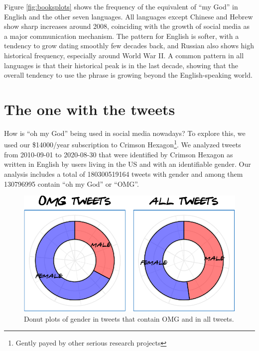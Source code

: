 \documentclass[]{article}
\begin{document}
Figure \ref{fig:booksplots} shows the frequency of the equivalent of ``my God'' in English and the other seven languages. All languages except Chinese and Hebrew show sharp increases around 2008, coinciding with the growth of social media as a major communication mechanism. The pattern for English is softer, with a tendency to grow dating smoothly few decades back, and Russian also shows high historical frequency, especially around World War II. A common pattern in all languages is that their historical peak is in the last decade, showing that the overall tendency to use the phrase is growing beyond the English-speaking world.

\hypertarget{the-one-with-the-tweets}{%
\section{The one with the tweets}\label{the-one-with-the-tweets}}

How is ``oh my God'' being used in social media nowadays? To explore this, we used our \$14000/year subscription to Crimson Hexagon\footnote{Gently payed by other serious research projects}. We analyzed tweets from
2010-09-01 to 2020-08-30 that were identified by Crimson Hexagon as written in English by users living in the US and with an identifiable gender. Our analysis includes a total of 180300519164 tweets with gender and among them 130796995 contain ``oh my God'' or ``OMG''.

\begin{figure}

{\centering \includegraphics{Friends_HPS_pdf_files/figure-latex/twittergender-1} 

}

\caption{Donut plots of gender in tweets that contain OMG and in all tweets.}\label{fig:twittergender}
\end{figure}
\end{document}
